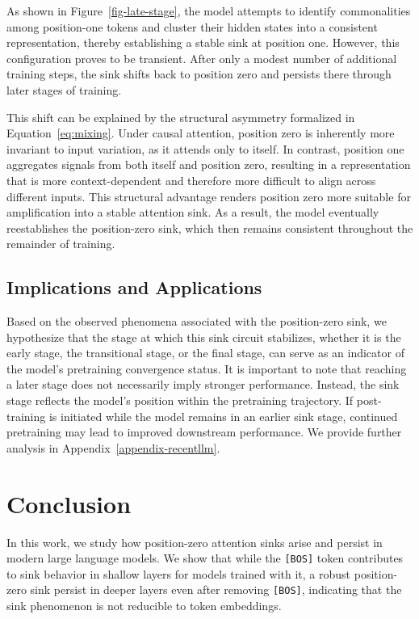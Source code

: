 \documentclass[]{template}
\theoremstyle{plain}
\theoremstyle{definition}
\theoremstyle{remark}
\begin{document}
As shown in Figure~\ref{fig-late-stage}, the model attempts to identify commonalities among position-one tokens and cluster their hidden states into a consistent representation, thereby establishing a stable sink at position one. However, this configuration proves to be transient. After only a modest number of additional training steps, the sink shifts back to position zero and persists there through later stages of training.

This shift can be explained by the structural asymmetry formalized in Equation~\ref{eq:mixing}. Under causal attention, position zero is inherently more invariant to input variation, as it attends only to itself. In contrast, position one aggregates signals from both itself and position zero, resulting in a representation that is more context-dependent and therefore more difficult to align across different inputs. This structural advantage renders position zero more suitable for amplification into a stable attention sink. As a result, the model eventually reestablishes the position-zero sink, which then remains consistent throughout the remainder of training.

\subsection{Implications and Applications}

Based on the observed phenomena associated with the position-zero sink, we hypothesize that the stage at which this sink circuit stabilizes, whether it is the early stage, the transitional stage, or the final stage, can serve as an indicator of the model’s pretraining convergence status. It is important to note that reaching a later stage does not necessarily imply stronger performance. Instead, the sink stage reflects the model’s position within the pretraining trajectory. If post-training is initiated while the model remains in an earlier sink stage, continued pretraining may lead to improved downstream performance. We provide further analysis in Appendix~\ref{appendix-recentllm}.

\section{Conclusion}

In this work, we study how position-zero attention sinks arise and persist in modern large language models. We show that while the \texttt{[BOS]} token contributes to sink behavior in shallow layers for models trained with it, a robust position-zero sink persist in deeper layers even after removing \texttt{[BOS]}, indicating that the sink phenomenon is not reducible to token embeddings.
\end{document}
